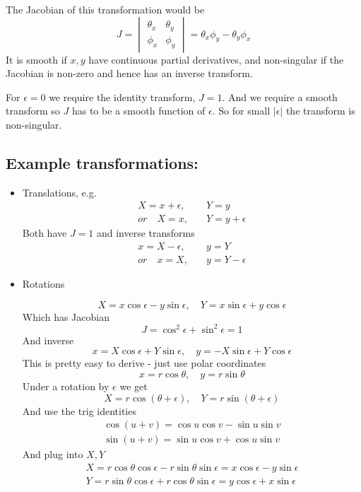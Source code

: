 \documentclass{E:/Documents/Latex/myassignment}
\begin{document}
The Jacobian of this transformation would be
\[J = \begin{vmatrix}
	\theta_x & \theta_y \\ \phi_x & \phi_y
\end{vmatrix} = \theta_x \phi_y - \theta_y \phi_x\]
It is smooth if $x,y$ have continuous partial derivatives, and non-singular if the Jacobian is non-zero and hence has an inverse transform.

For $\epsilon = 0$ we require the identity transform, $J=1$. And we require a smooth transform so $J$ has to be a smooth function of $\epsilon$. So for small $|\epsilon|$ the transform is non-singular.

\subsection{Example transformations:}
\begin{itemize}
	\item Translations, e.g.
	\begin{align*}
		X = x + \epsilon, &\quad Y =y\\
		or \quad X =x , &\quad Y = y + \epsilon
	\end{align*}
	Both have $J=1$ and inverse transforms
	\begin{align*}
		x = X- \epsilon, &\quad y = Y\\
		or \quad x = X, &\quad y = Y - \epsilon
	\end{align*}

	\item Rotations

	\[X = x \cos \epsilon - y \sin \epsilon, \quad Y = x \sin \epsilon + y \cos \epsilon\]
	Which has Jacobian
	\[J = \cos^2 \epsilon + \sin^2 \epsilon = 1\]
	And inverse
	\[x = X \cos \epsilon + Y \sin \epsilon, \quad y = -X \sin \epsilon + Y \cos \epsilon\]
	This is pretty easy to derive - just use polar coordinates
	\[x = r\cos\theta, \quad y= r \sin\theta\]
	Under a rotation by $\epsilon$ we get
	\[X = r \cos(\theta + \epsilon), \quad Y = r\sin(\theta + \epsilon)\]
	And use the trig identities
	\begin{align*}
		\cos(u + v) = \cos u \cos v - \sin u \sin v\\
		\sin(u+v) = \sin u \cos v + \cos u \sin v
	\end{align*}
	And plug into $X,Y$
	\begin{align*}
		X = r\cos\theta \cos \epsilon - r \sin\theta \sin \epsilon = x \cos \epsilon - y \sin \epsilon\\
		Y = r \sin\theta \cos \epsilon + r \cos\theta \sin \epsilon = y \cos \epsilon + x\sin \epsilon
	\end{align*}



\end{itemize}
\end{document}
